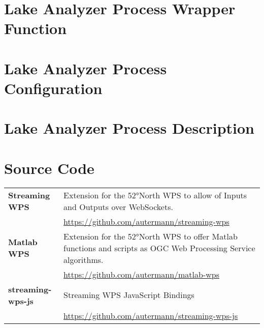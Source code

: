\documentclass[paper=a4,
               fontsize=11pt,
               bibliography=totoc,
               listof=nochaptergap,
               listof=notoc,
               numbers=noendperiod,
               parskip=half,
               footnotes=multiple,
               toc=numberline,
               captions=tableheading,
               DIV=10,
              ]{scrreprt}
\begin{document}
  \begin{appendix}
    \chapter{Lake Analyzer Process Wrapper Function}
      \label{appendix:lakeanalyzer:wrapper}
      

    \chapter{Lake Analyzer Process Configuration}
      \label{appendix:lakeanalyzer:configuration}
      

    \chapter{Lake Analyzer Process Description}
      \label{appendix:lakeanalyzer:description}
      

    \chapter{Source Code}
      \begin{tabularx}{\textwidth}{@{}lX@{}}
        \toprule
        \textbf{Streaming WPS}
        & Extension for the 52°North WPS to allow of Inputs and Outputs over WebSockets.\\
        & \url{https://github.com/autermann/streaming-wps} \\
        \cmidrule(r){1-1}
        \cmidrule(l){2-2}

        \textbf{Matlab WPS}
        & Extension for the 52°North WPS to offer Matlab functions and scripts as OGC Web Processing Service algorithms.\\
        & \url{https://github.com/autermann/matlab-wps}\\
        \cmidrule(r){1-1}
        \cmidrule(l){2-2}

        \textbf{streaming-wps-js}
        & Streaming WPS JavaScript Bindings\\
        & \url{https://github.com/autermann/streaming-wps-js}\\
        \cmidrule(r){1-1}
        \cmidrule(l){2-2}


\end{tabularx}
\end{appendix}
\end{document}
